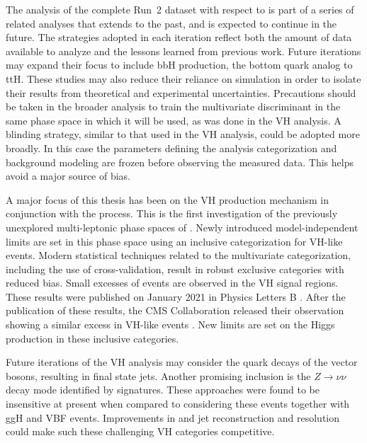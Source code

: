 The analysis of the complete Run~2 dataset with respect to \hmm is part of a series of related analyses that extends to the past, and is expected to continue in the future.
The strategies adopted in each iteration reflect both the amount of data available to analyze and the lessons learned from previous work.
Future iterations may expand their focus to include bbH production, the bottom quark analog to ttH.
These studies may also reduce their reliance on simulation in order to isolate their results from theoretical and experimental uncertainties.
Precautions should be taken in the broader \hmm analysis to train the multivariate discriminant in the same phase space in which it will be used, as was done in the VH analysis.
A blinding strategy, similar to that used in the VH analysis, could be adopted more broadly. 
In this case the parameters defining the analysis categorization and background modeling are frozen before observing the measured data.
This helps avoid a major source of bias.

A major focus of this thesis has been on the VH production mechanism in conjunction with the \hmm process.
This is the first investigation of the previously unexplored multi-leptonic phase spaces of \vhllmm.
Newly introduced model-independent limits are set in this phase space using an inclusive categorization for VH-like events.
Modern statistical techniques related to the multivariate categorization, including the use of cross-validation, result in robust exclusive categories with reduced bias.
Small excesses of events are observed in the VH signal regions.
These results were published on January 2021 in Physics Letters B \cite{atlasHmm}.
After the publication of these results, the CMS Collaboration released their observation showing a similar excess in VH-like events \cite{cmsHmm}.
New limits are set on the Higgs production in these inclusive categories.

Future iterations of the VH analysis may consider the quark decays of the vector bosons, resulting in final state jets.
Another promising inclusion is the $Z\to\nu\nu$ decay mode identified by \met signatures.
These approaches were found to be insensitive at present when compared to considering these events together with ggH and VBF events.
Improvements in \met and jet reconstruction and resolution could make such these challenging VH categories competitive.

